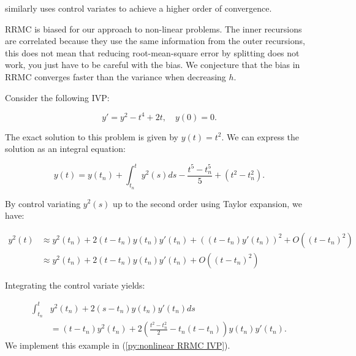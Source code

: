 \documentclass[a4paper,12pt]{article}
\begin{document}
\begin{related}[CV RRMC]
    \cite{daun_randomized_2011} similarly uses control variates to achieve
    a higher order of convergence.
\end{related}

RRMC is biased for our approach to non-linear problems.
The inner recursions are correlated because they use the same
information from the outer recursions, this does not mean that reducing
root-mean-square error by splitting does not work, you just have to be careful
with the bias. We conjecture that the bias in RRMC converges faster than the
variance when decreasing $h$.


\begin{example} \label{ex:nonlinear RRMC IVP}
    Consider the following IVP:

    \begin{equation}
        y' = y^{2} - t^{4} + 2t, \quad y(0) = 0.
    \end{equation}

    The exact solution to this problem is given by $y(t) = t^{2}$.
    We can express the solution as an integral equation:

    \begin{equation}
        y(t) = y(t_{n}) + \int_{t_{n}}^{t} y^{2}(s) ds
        - \frac{t^{5}-t_{n}^{5}}{5} + (t^{2}-t_{n}^{2}).
    \end{equation}

    By control variating $y^2(s)$ up to the second order using Taylor expansion,
    we have:

    \begin{align}
        y^2(t) & \approx y^2(t_n) + 2(t-t_n)y(t_n)y'(t_n) + ((t-t_n)y'(t_n))^2 + O((t-t_n)^2) \\
               & \approx y^2(t_n) + 2(t-t_n)y(t_n)y'(t_n) + O((t-t_n)^2)
    \end{align}

    Integrating the control variate yields:

    \begin{align}
        \int_{t_{n}}^{t} & y^{2}(t_{n}) + 2(s-t_{n})y(t_{n})y'(t_{n}) ds \\
                         & = (t-t_{n})y^{2}(t_{n})+
        2\left(\frac{t^{2}-t_{n}^{2}}{2} -t_{n}(t-t_{n}) \right)y(t_{n})y'(t_{n}).
    \end{align}
    We implement this example in (\ref{py:nonlinear RRMC IVP}).
\end{example}
\end{document}
